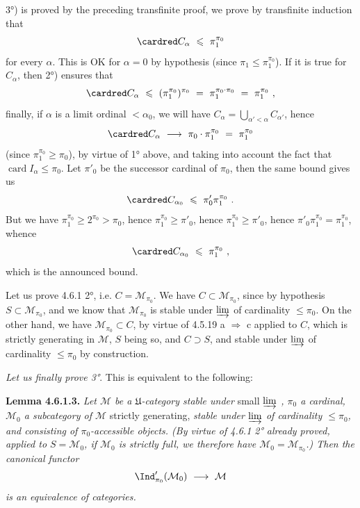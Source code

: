 3°) is proved by the preceding transfinite proof, we prove by transfinite induction that
\[
\cardred C_\alpha \ \leqslant\ \pi_1^{\pi_0}
\]
for every $\alpha$. This is OK for $\alpha=0$ by hypothesis (since $\pi_1\leqslant\pi_1^{\pi_0}$). If it is true for $C_\alpha$, then 2°) ensures that
\[
\cardred C_\alpha \ \leqslant\ (\pi_1^{\pi_0})^{\pi_0} \ =\ \pi_1^{\pi_0\cdot\pi_0} \ =\ \pi_1^{\pi_0}\ , %
\]
finally, if $\alpha$ is a limit ordinal $<\alpha_0$, we will have $C_\alpha=\bigcup_{\alpha'<\alpha}C_{\alpha'}$, hence
\[
\cardred C_\alpha \ \longrightarrow\ \pi_0\cdot\pi_1^{\pi_0} \ =\ \pi_1^{\pi_0} %
\]
(since $\pi_1^{\pi_0}\geqslant\pi_0$), by virtue of 1° above, and taking into account the fact that $\operatorname{card}I_\alpha\leqslant\pi_0$. Let $\pi'_0$ be the successor cardinal of $\pi_0$, then the same bound gives us
\[
\cardred C_{\alpha_0} \ \leqslant\ \pi'_0\pi_1^{\pi_0}\ .
\]
But we have $\pi_1^{\pi_0}\geqslant2^{\pi_0}>\pi_0$, hence $\pi_1^{\pi_0}\geqslant\pi'_0$, hence $\pi_1^{\pi_0}\geqslant\pi'_0$, hence $\pi'_0\pi_1^{\pi_0}=\pi_1^{\pi_0}$, whence
\[
\cardred C_{\alpha_0} \ \leqslant\ \pi_1^{\pi_0}\ ,
\]
which is the announced bound.


Let us prove 4.6.1 2°, i.e. $C=\mathcal{M}_{\pi_0}$. We have $C\subset\mathcal{M}_{\pi_0}$, since by hypothesis $S\subset\mathcal{M}_{\pi_0}$, and we know that $\mathcal{M}_{\pi_0}$ is stable under $\varinjlim$ of cardinality $\leqslant\pi_0$. On the other hand, we have $\mathcal{M}_{\pi_0}\subset C$, by virtue of 4.5.19 a $\Longrightarrow$ c applied to $C$, which is strictly generating in $\mathcal{M}$, $S$ being so, and $C\supset S$, and stable under $\varinjlim$ of cardinality $\leqslant\pi_0$ by construction.

\textit{Let us finally prove 3°}. This is equivalent to the following:

\textbf{Lemma 4.6.1.3.} \textit{Let $\mathcal{M}$ be a $\mathfrak{U}$-category stable under} small \textit{$\varinjlim$ , $\pi_0$ a cardinal, $\mathcal{M}_0$ a subcategory of $\mathcal{M}$} strictly generating, \textit{stable under $\varinjlim$ of cardinality $\leqslant\pi_0$, and consisting of $\pi_0$-accessible objects. (By virtue of 4.6.1 2° already proved, applied to $S=\mathcal{M}_0$, if $\mathcal{M}_0$ is strictly full, we therefore have $\mathcal{M}_0=\mathcal{M}_{\pi_0}$.) Then the canonical functor}
\[
\Ind'_{\pi_0}(\mathcal{M}_0) \ \longrightarrow\ \mathcal{M}
\]
\textit{is an equivalence of categories.}

